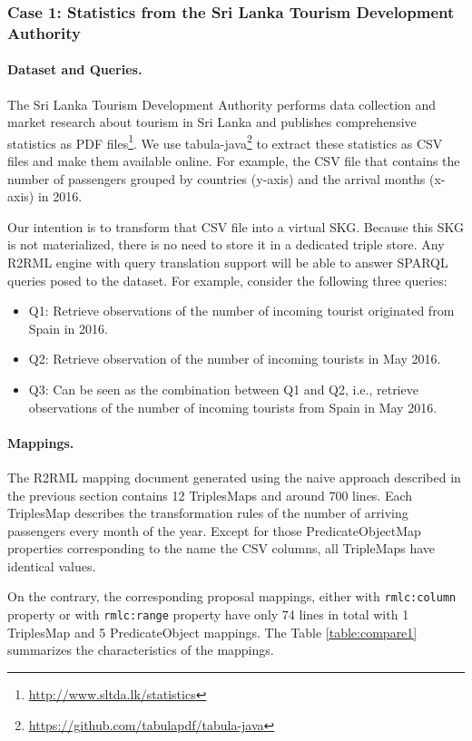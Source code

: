 \subsubsection{Case 1: Statistics from the Sri Lanka Tourism Development Authority}
\noindent\paragraph{Dataset and Queries.}
The Sri Lanka Tourism Development Authority performs data collection and market research about tourism in Sri Lanka and publishes comprehensive statistics as PDF files\footnote{\url{http://www.sltda.lk/statistics}}. We use tabula-java\footnote{\url{https://github.com/tabulapdf/tabula-java}} to extract these statistics as CSV files and make them available online. For example, the CSV file that contains the number of passengers grouped by countries (y-axis) and the arrival months (x-axis) in 2016.

Our intention is to transform that CSV file into a virtual SKG. Because this SKG is not materialized, there is no need to store it in a dedicated triple store. Any R2RML engine with query translation support will be able to answer SPARQL queries posed to the dataset. For example, consider the following three queries:
\begin{itemize}
\item Q1: Retrieve observations of the number of incoming tourist originated from Spain in 2016.
\item Q2: Retrieve observation of the number of incoming tourists in May 2016.
\item Q3: Can be seen as the combination between Q1 and Q2, i.e., retrieve observations of the number of incoming tourists from Spain in May 2016. 
\end{itemize}

\noindent\paragraph{Mappings.}
The R2RML mapping document generated using the naive approach described in the previous section contains 12 TriplesMaps and around 700 lines. Each TriplesMap describes the transformation rules of the number of arriving passengers every month of the year. Except for those PredicateObjectMap properties corresponding to the name the CSV columns, all TripleMaps have identical values. 

On the contrary, the corresponding proposal mappings, either with \texttt{rmlc:column} property or with \texttt{rmlc:range} property have only 74 lines in total with 1 TriplesMap and 5 PredicateObject mappings. The Table \ref{table:compare1} summarizes the characteristics of the mappings.

